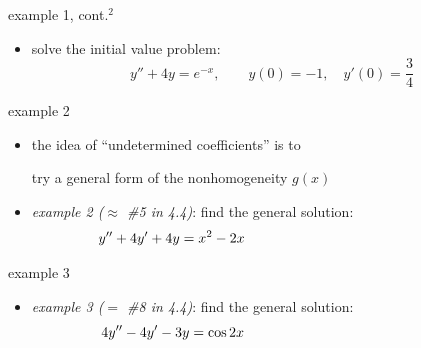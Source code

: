 \documentclass{beamer}
\begin{document}
\begin{frame}{example 1, cont.$^2$}

\begin{itemize}
\item solve the initial value problem:
    $$y'' + 4 y = e^{-x}, \qquad y(0)=-1, \quad y'(0)=\frac{3}{4}$$

\vspace{60mm}
\end{itemize}
\end{frame}


\begin{frame}{example 2}

\begin{itemize}
\item the idea of ``undetermined coefficients'' is to

\centerline{\alert{try a general form of the nonhomogeneity $g(x)$}}
\item \emph{example 2 ($\approx$ \#5 in 4.4)}: find the general solution:
    $$y'' + 4 y' + 4y = x^2 - 2 x \hspace{50mm}$$
\end{itemize}

\vspace{50mm}
\end{frame}


\begin{frame}{example 3}

\begin{itemize}
\item \emph{example 3 ($=$ \#8 in 4.4)}: find the general solution:
    $$4 y'' - 4 y' - 3 y = \cos 2x \hspace{50mm}$$
\end{itemize}

\vspace{60mm}
\end{frame}
\end{document}
